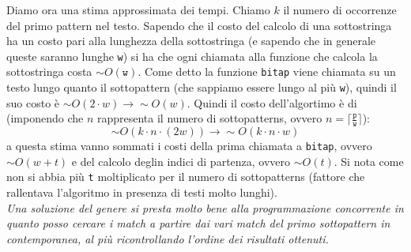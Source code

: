 \documentclass[a4paper,12pt, oneside]{article}
\begin{document}
Diamo ora una stima approssimata dei tempi. Chiamo $k$ il numero di
occorrenze del primo pattern nel testo. Sapendo che il costo del
calcolo di una sottostringa ha un costo pari alla lunghezza della
sottostringa (e sapendo che in generale queste saranno lunghe
\texttt{w}) si ha che ogni chiamata alla funzione che calcola la
sottostringa costa $\sim O(\mathtt{w})$. Come detto la funzione
\texttt{bitap} viene chiamata su un testo lungo quanto il sottopattern
(che sappiamo essere lungo al più \texttt{w}), 
quindi il suo costo è $\sim O(2\cdot w)\to\sim O(w)$. Quindi il costo
dell'algortimo è di (imponendo che $n$ rappresenta il numero di
sottopatterns, ovvero $n=\big\lceil
  \frac{\mathtt{p}}{\mathtt{w}}\big\rceil$):
\[\sim O(k\cdot n\cdot (2w))
  \to\sim O(k\cdot n\cdot w)
\]
a questa stima vanno sommati i costi della prima chiamata a
\texttt{bitap}, ovvero $\sim O(w + t)$ e del calcolo deglin indici di
partenza, ovvero $\sim O(t)$. Si nota come non si abbia più \texttt{t}
moltiplicato per il numero di sottopatterns (fattore che rallentava
l'algoritmo in presenza di testi molto lunghi).\\
\textit{Una soluzione del genere si presta molto bene alla
  programmazione concorrente in quanto posso cercare i match a partire
dai vari match del primo sottopattern in contemporanea, al più
ricontrollando l'ordine dei risultati ottenuti.}
\newpage
\end{document}
